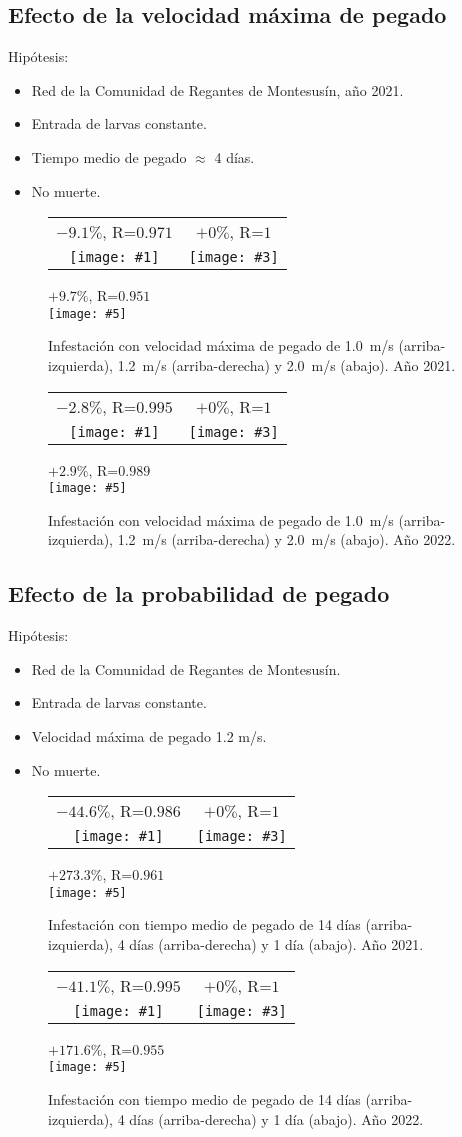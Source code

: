 \documentclass[a4paper]{article}
\newcommand{\FIGIIIB}[8]
{
	\begin{figure}[ht!]
		\centering
		\begin{tabular}{cc}
			#2&#4\\
			\texttt{[image: \#1]}&
			\texttt{[image: \#3]}\\
		\end{tabular}
		#6\\
		\texttt{[image: \#5]}
		\caption{#7.\label{#8}}
	\end{figure}
}
\begin{document}
\clearpage
\subsection{Efecto de la velocidad máxima de pegado}

Hipótesis:
\begin{itemize}
\item Red de la Comunidad de Regantes de Montesusín, año 2021.
\item Entrada de larvas constante.
\item Tiempo medio de pegado $\approx$ 4 días.
\item No muerte.
\end{itemize}

\FIGIIIB{2021-mussel-velocity-1.0.pdf}{$-9.1\%$, R=$0.971$}
{2021-mussel-constant.pdf}{$+0\%$, R=$1$}
{2021-mussel-velocity-2.0.pdf}{$+9.7\%$, R=$0.951$}
{Infestación con velocidad máxima de pegado de
1.0~m/s (arriba-izquierda), 1.2~m/s (arriba-derecha) y 2.0~m/s (abajo). Año
2021}{Fig2021MusselVelocity}

\FIGIIIB{2022-mussel-velocity-1.0.pdf}{$-2.8\%$, R=$0.995$}
{2022-mussel-constant.pdf}{$+0\%$, R=$1$}
{2022-mussel-velocity-2.0.pdf}{$+2.9\%$, R=$0.989$}
{Infestación con velocidad máxima de pegado de
1.0~m/s (arriba-izquierda), 1.2~m/s (arriba-derecha) y 2.0~m/s (abajo). Año
2022}{Fig2022MusselVelocity}

\clearpage
\subsection{Efecto de la probabilidad de pegado}

Hipótesis:
\begin{itemize}
\item Red de la Comunidad de Regantes de Montesusín.
\item Entrada de larvas constante.
\item Velocidad máxima de pegado 1.2 m/s.
\item No muerte.
\end{itemize}

\FIGIIIB{2021-mussel-cling-1.1.pdf}{$-44.6\%$, R=$0.986$}
{2021-mussel-constant.pdf}{$+0\%$, R=$1$}
{2021-mussel-cling-8.0.pdf}{$+273.3\%$, R=$0.961$}
{Infestación con tiempo medio de pegado de
14 días (arriba-izquierda), 4 días (arriba-derecha) y 1 día (abajo). Año 2021}
{Fig2021MusselCling}

\FIGIIIB{2022-mussel-cling-1.1.pdf}{$-41.1\%$, R=$0.995$}
{2022-mussel-constant.pdf}{$+0\%$, R=$1$}
{2022-mussel-cling-8.0.pdf}{$+171.6\%$, R=$0.955$}
{Infestación con tiempo medio de pegado de
14 días (arriba-izquierda), 4 días (arriba-derecha) y 1 día (abajo). Año 2022}
{Fig2022MusselCling}
\end{document}
